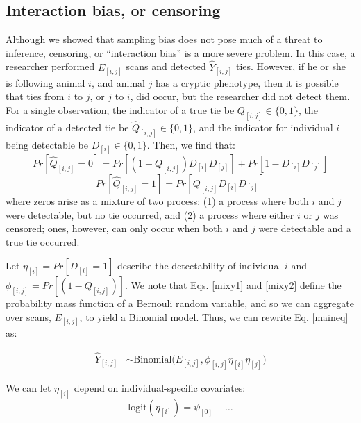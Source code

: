 \documentclass[Afour,sageh,times]{sagej}
\begin{document}
\subsection{Interaction bias, or censoring}
Although we showed that sampling bias does not pose much of a threat to inference, censoring, or ``interaction bias'' is a more severe problem. In this case, a researcher performed $E_{[i,j]}$ scans and detected $\hat Y_{[i,j]}$ ties. However, if he or she is following animal $i$, and animal $j$ has a cryptic phenotype, then it is possible that ties from $i$ to $j$, or $j$ to $i$,  did occur, but the researcher did not detect them. For a single observation, the indicator of a true tie be $Q_{[i,j]} \in\{0,1\}$, the indicator of a detected tie be $\hat Q_{[i,j]}\in\{0,1\}$, and the indicator for individual $i$ being detectable be $D_{[i]}\in\{0,1\}$. Then, we find that:
  \begin{equation}\label{mixy1}
    Pr[\hat Q_{[i,j]}=0] = Pr[(1-Q_{[i,j]})D_{[i]}D_{[j]}] + Pr[1-D_{[i]}D_{[j]}]
  \end{equation}
  \begin{equation}\label{mixy2}
    Pr[\hat Q_{[i,j]}=1] = Pr[Q_{[i,j]}D_{[i]}D_{[j]}]
  \end{equation}
  where zeros arise as a mixture of two process: (1) a process where both $i$ and $j$ were detectable, but no tie occurred, and (2) a process where either $i$ or $j$ was censored; ones, however, can only occur when both $i$ and $j$ were detectable and a true tie occurred. 
  
Let $\eta_{[i]}=Pr[D_{[i]}=1]$ describe the detectability of individual $i$ and $\phi_{[i,j]}=Pr[(1-Q_{[i,j]})]$. We note that Eqs. \ref{mixy1} and \ref{mixy2} define the probability mass function of a Bernouli random variable, and so we can aggregate over scans, $E_{[i,j]}$, to yield a Binomial model. Thus, we can rewrite Eq. \ref{maineq} as:

\begin{ceqn}
\begin{align}\label{maineq2}
	\hat Y_{[i,j]} &\sim \mathrm{Binomial}\Big(E_{[i,j]}, \phi_{[i,j]}\eta_{[i]}\eta_{[j]} \Big)
\end{align}
\end{ceqn}

We can let $\eta_{[i]}$ depend on individual-specific covariates:
\begin{equation}\label{mixy2}
\text{logit}(\eta_{[i]}) = \psi_{[0]} + \ldots 
\end{equation}
\end{document}
